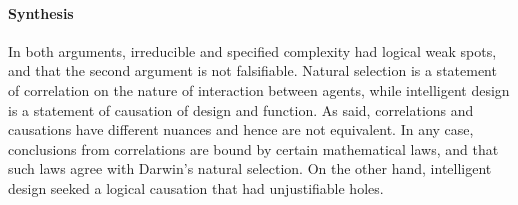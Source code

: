 \paragraph{Synthesis}
In both arguments, irreducible and specified complexity had logical weak spots, and that the second argument is not falsifiable.
Natural selection is a statement of correlation on the nature of interaction between agents, while intelligent design is a statement of causation of design and function.
As said, correlations and causations have different nuances and hence are not equivalent.
In any case, conclusions from correlations are bound by certain mathematical laws, and that such laws agree with Darwin's natural selection.
On the other hand, intelligent design seeked a logical causation that had unjustifiable holes.
